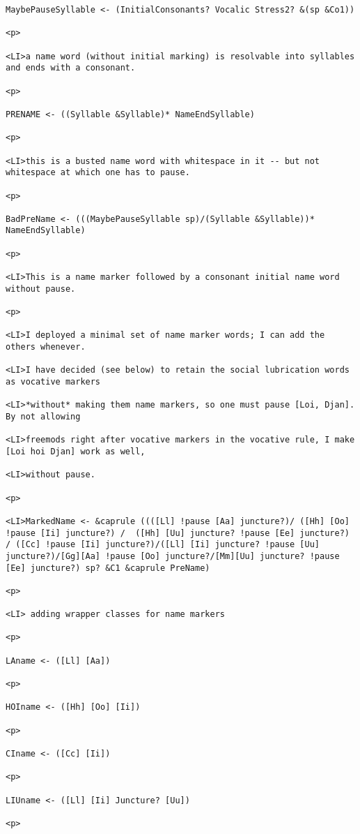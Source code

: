 \documentclass[12pt]{article}
\begin{document}
\begin{lstlisting}
MaybePauseSyllable <- (InitialConsonants? Vocalic Stress2? &(sp &Co1))

<p>

<LI>a name word (without initial marking) is resolvable into syllables and ends with a consonant.

<p>

PRENAME <- ((Syllable &Syllable)* NameEndSyllable)

<p>

<LI>this is a busted name word with whitespace in it -- but not whitespace at which one has to pause.

<p>

BadPreName <- (((MaybePauseSyllable sp)/(Syllable &Syllable))* NameEndSyllable)

<p>

<LI>This is a name marker followed by a consonant initial name word without pause.

<p>

<LI>I deployed a minimal set of name marker words; I can add the others whenever.

<LI>I have decided (see below) to retain the social lubrication words as vocative markers

<LI>*without* making them name markers, so one must pause [Loi, Djan].  By not allowing

<LI>freemods right after vocative markers in the vocative rule, I make [Loi hoi Djan] work as well,

<LI>without pause.

<p>

<LI>MarkedName <- &caprule ((([Ll] !pause [Aa] juncture?)/ ([Hh] [Oo] !pause [Ii] juncture?) /  ([Hh] [Uu] juncture? !pause [Ee] juncture?) / ([Cc] !pause [Ii] juncture?)/([Ll] [Ii] juncture? !pause [Uu] juncture?)/[Gg][Aa] !pause [Oo] juncture?/[Mm][Uu] juncture? !pause [Ee] juncture?) sp? &C1 &caprule PreName)

<p>

<LI> adding wrapper classes for name markers

<p>

LAname <- ([Ll] [Aa])

<p>

HOIname <- ([Hh] [Oo] [Ii])

<p>

CIname <- ([Cc] [Ii])

<p>

LIUname <- ([Ll] [Ii] Juncture? [Uu])

<p>


\end{lstlisting}
\end{document}
